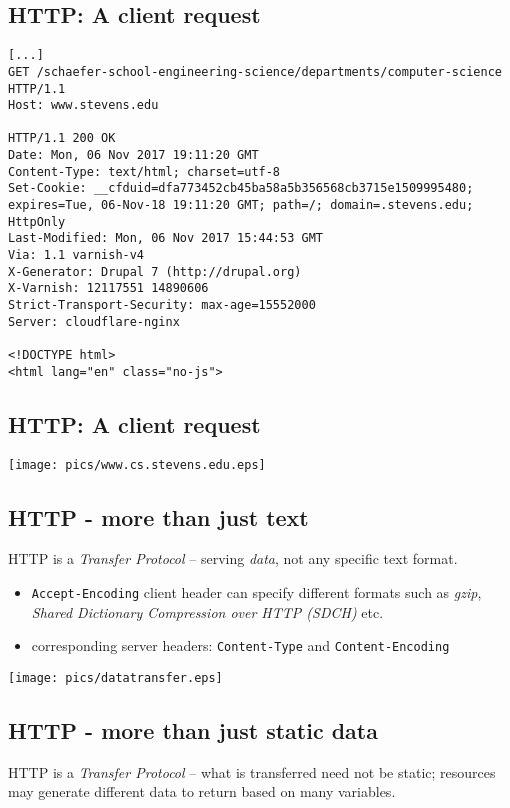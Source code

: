 \documentclass[xga]{xdvislides}
\begin{document}
\subsection{HTTP: A client request}
\smallish
\begin{verbatim}
[...]
GET /schaefer-school-engineering-science/departments/computer-science HTTP/1.1
Host: www.stevens.edu

HTTP/1.1 200 OK
Date: Mon, 06 Nov 2017 19:11:20 GMT
Content-Type: text/html; charset=utf-8
Set-Cookie: __cfduid=dfa773452cb45ba58a5b356568cb3715e1509995480;
expires=Tue, 06-Nov-18 19:11:20 GMT; path=/; domain=.stevens.edu; HttpOnly
Last-Modified: Mon, 06 Nov 2017 15:44:53 GMT
Via: 1.1 varnish-v4
X-Generator: Drupal 7 (http://drupal.org)
X-Varnish: 12117551 14890606
Strict-Transport-Security: max-age=15552000
Server: cloudflare-nginx

<!DOCTYPE html>
<html lang="en" class="no-js">

\end{verbatim}
\Normalsize

\subsection{HTTP: A client request}
\begin{center}
	\texttt{[image: pics/www.cs.stevens.edu.eps]}
\end{center}


\subsection{HTTP - more than just text}
HTTP is a {\em Transfer Protocol} -- serving {\em data}, not any specific
text format.

\begin{itemize}
	\item {\tt Accept-Encoding} client header can specify different formats
		such as {\em gzip}, {\em Shared Dictionary Compression over HTTP (SDCH)} etc.
	\item corresponding server headers: {\tt Content-Type} and
		{\tt Content-Encoding}
\end{itemize}
\begin{center}
	\texttt{[image: pics/datatransfer.eps]}
\end{center}

\subsection{HTTP - more than just static data}
HTTP is a {\em Transfer Protocol} -- what is transferred need not be
static; resources may generate different data to return based on many
variables.
\end{document}
